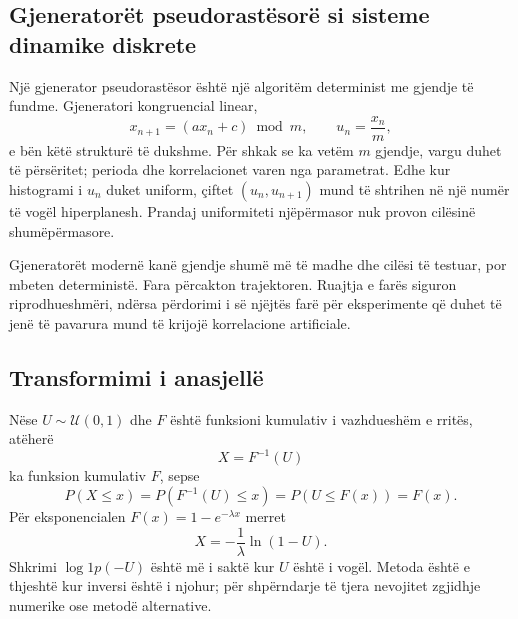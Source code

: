 \documentclass[11pt,oneside,openany]{book}
\begin{document}
\subsection{Gjeneratorët pseudorastësorë si sisteme dinamike diskrete}
Një gjenerator pseudorastësor është një algoritëm determinist me gjendje të fundme. Gjeneratori kongruencial linear,
\begin{equation}
 x_{n+1}=(ax_n+c)\bmod m,
 \qquad u_n=\frac{x_n}{m},
\end{equation}
e bën këtë strukturë të dukshme. Për shkak se ka vetëm $m$ gjendje, vargu duhet të përsëritet; perioda dhe korrelacionet varen nga parametrat. Edhe kur histogrami i $u_n$ duket uniform, çiftet $(u_n,u_{n+1})$ mund të shtrihen në një numër të vogël hiperplanesh. Prandaj uniformiteti njëpërmasor nuk provon cilësinë shumëpërmasore.

Gjeneratorët modernë kanë gjendje shumë më të madhe dhe cilësi të testuar, por mbeten deterministë. Fara përcakton trajektoren. Ruajtja e farës siguron riprodhueshmëri, ndërsa përdorimi i së njëjtës farë për eksperimente që duhet të jenë të pavarura mund të krijojë korrelacione artificiale.

\subsection{Transformimi i anasjellë}
Nëse $U\sim\mathcal U(0,1)$ dhe $F$ është funksioni kumulativ i vazhdueshëm e rritës, atëherë
\begin{equation}
 X=F^{-1}(U)
\end{equation}
ka funksion kumulativ $F$, sepse
\begin{equation}
 P(X\le x)=P(F^{-1}(U)\le x)=P(U\le F(x))=F(x).
\end{equation}
Për eksponencialen $F(x)=1-e^{-\lambda x}$ merret
\begin{equation}
 X=-\frac{1}{\lambda}\ln(1-U).
\end{equation}
Shkrimi $\log1p(-U)$ është më i saktë kur $U$ është i vogël. Metoda është e thjeshtë kur inversi është i njohur; për shpërndarje të tjera nevojitet zgjidhje numerike ose metodë alternative.
\end{document}
